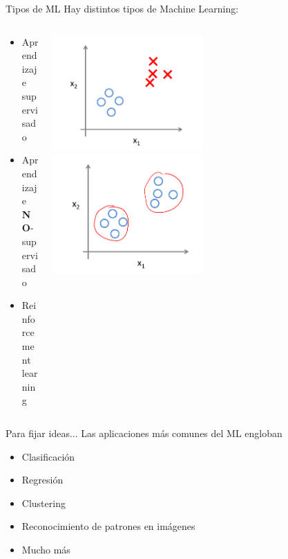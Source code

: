 \documentclass[11pt]{beamer}
\begin{document}
\begin{frame}{Tipos de ML}
Hay distintos tipos de Machine Learning:
\begin{columns}
\begin{column}{0.3\textwidth}
    \begin{itemize}[<+->]
        \item Aprendizaje supervisado
        \item Aprendizaje \textbf{NO}-supervisado
        \item Reinforcement learning
    \end{itemize}
\end{column}
\begin{column}{0.7\textwidth}
\includegraphics[width=0.5\textwidth]{images/supervised.png}
\includegraphics[width=0.5\textwidth]{images/unsupervised.png}
\end{column}
\end{columns}
\end{frame}
\begin{frame}{Para fijar ideas...}
    Las aplicaciones m\'as comunes del ML engloban
    \begin{itemize}
        \item Clasificaci\'on
        \item Regresi\'on
        \item Clustering
        \item Reconocimiento de patrones en im\'agenes
        \item Mucho m\'as
    \end{itemize}
\end{frame}
\end{document}
